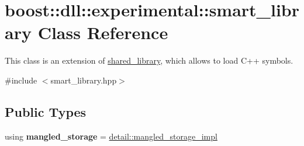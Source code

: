\hypertarget{a00281}{}\section{boost\+:\+:dll\+:\+:experimental\+:\+:smart\+\_\+library Class Reference}
\label{a00281}


This class is an extension of \hyperlink{a00271}{shared\+\_\+library}, which allows to load C++ symbols.  




{\ttfamily \#include $<$smart\+\_\+library.\+hpp$>$}

\subsection*{Public Types}
\begin{DoxyCompactItemize}
\item 
using {\bfseries mangled\+\_\+storage} = \hyperlink{a00214}{detail\+::mangled\+\_\+storage\+\_\+impl}\hypertarget{a00281_a65625089fb4e558286ca48bdab2d8511}{}\label{a00281_a65625089fb4e558286ca48bdab2d8511}

\end{DoxyCompactItemize}
